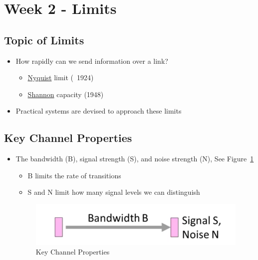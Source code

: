 \documentclass[12pt]{ctexart}   %
\begin{document}
\section{Week 2 - Limits}
	\subsection{Topic of Limits}
	\begin{itemize}
		\item How rapidly can we send information over a link?
		\begin{itemize}
			\item \underline{Nyquist} limit (~1924)
			\item \underline{Shannon} capacity (1948)
		\end{itemize}
		
		\item Practical systems are devised to approach these limits
	\end{itemize}
	
	\subsection{Key Channel Properties}
	\begin{itemize}
		\item The bandwidth (B), signal strength (S), and noise strength (N), See Figure~\ref{fig:2-5-1}
		\begin{itemize}
			\item B limits the rate of transitions
			\item S and N limit how many signal levels we can distinguish
		\end{itemize}
		
		 \begin{figure}[h!] %
		 \centering
		 \includegraphics[scale=0.7]{images/2-5-1}
		\caption{ Key Channel Properties}
		 \label{fig:2-5-1}
		 \end{figure}
	\end{itemize}
	
\end{document}
